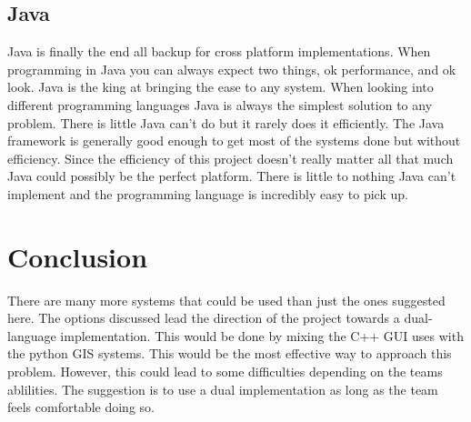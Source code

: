 \documentclass[onecolumn, draftclsnofoot,10pt, compsoc]{IEEEtran}
\begin{document}
      \subsection{Java}
      Java is finally the end all backup for cross platform implementations. When programming in Java you can always expect two things, ok performance, and ok look. Java is the king at bringing the ease to any system. When looking into different programming languages Java is always the simplest solution to any problem. There is little Java can't do but it rarely does it efficiently. The Java framework is generally good enough to get most of the systems done but without efficiency. Since the efficiency of this project doesn't really matter all that much Java could possibly be the perfect platform. There is little to nothing Java can't implement and the programming language is incredibly easy to pick up. 

      \section{Conclusion}
      There are many more systems that could be used than just the ones suggested here. The options discussed lead the direction of the project towards a dual-language implementation. This would be done by mixing the C++ GUI uses with the python GIS systems. This would be the most effective way to approach this problem. However, this could lead to some difficulties depending on the teams ablilities. The suggestion is to use a dual implementation as long as the team feels comfortable doing so.
        
\end{document}
